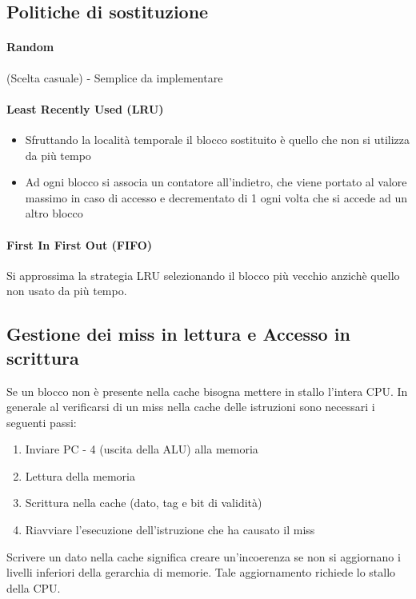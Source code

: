 \documentclass[12pt, a4paper, openany]{book}
\begin{document}
\subsection*{Politiche di sostituzione}
\paragraph{Random} (Scelta casuale) - Semplice da implementare
\paragraph{Least Recently Used (LRU)}
\begin{itemize}
    \item Sfruttando la località temporale il blocco sostituito è quello che non si
    utilizza da più tempo
    \item Ad ogni blocco si associa un contatore all'indietro, che viene portato al valore
    massimo in caso di accesso e decrementato di 1 ogni volta che si accede ad un altro blocco
\end{itemize}
\paragraph{First In First Out (FIFO)} Si approssima la strategia LRU selezionando il blocco
più vecchio anzichè quello non usato da più tempo.

\subsection{Gestione dei miss in lettura e Accesso in scrittura}
Se un blocco non è presente nella cache bisogna mettere in stallo l'intera CPU. In generale
al verificarsi di un miss nella cache delle istruzioni sono necessari i seguenti passi:
\begin{enumerate}
    \item Inviare PC - 4 (uscita della ALU) alla memoria
    \item Lettura della memoria
    \item Scrittura nella cache (dato, tag e bit di validità)
    \item Riavviare l'esecuzione dell'istruzione che ha causato il miss
\end{enumerate}

Scrivere un dato nella cache significa creare un'incoerenza se non si aggiornano i livelli
inferiori della gerarchia di memorie.
Tale aggiornamento richiede lo stallo della CPU.
\end{document}
